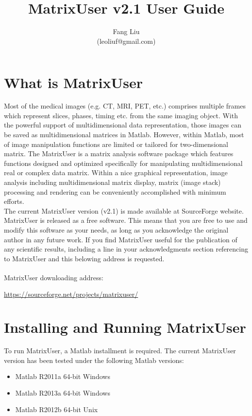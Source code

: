 \documentclass{article}%
\begin{document}
\title{MatrixUser v2.1 User Guide}
\author{Fang Liu \\ (leoliuf@gmail.com)}
\maketitle

\tableofcontents

\section{What is MatrixUser}
Most of the medical images (e.g. CT, MRI, PET, etc.) comprises multiple frames which represent slices, phases, timing etc. from the same imaging object. With the powerful support of multidimensional data representation, those images can be saved as multidimensional matrices in Matlab. However, within Matlab, most of image manipulation functions are limited or tailored for two-dimensional matrix. The MatrixUser is a matrix analysis software package which features functions designed and optimized specifically for manipulating multidimensional real or complex data matrix. Within a nice graphical representation, image analysis including multidimensional matrix display, matrix (image stack) processing and rendering can be conveniently accomplished with minimum efforts.\\

The current MatrixUser version (v2.1) is made available at SourceForge website. MatrixUser is released as a free software. This means that you are free to use and modify this software as your needs, as long as you acknowledge the original author in any future work. If you find MatrixUser useful for the publication of any scientific results, including a line in your acknowledgments section referencing to MatrixUser and this belowing address is requested.\\
\\
MatrixUser downloading address:
\begin{center}
\url{https://sourceforge.net/projects/matrixuser/}
\end{center}

\section{Installing and Running MatrixUser}

To run MatrixUser, a Matlab installment is required. The current MatrixUser version has been tested under the following Matlab versions:
\begin{itemize}
\item Matlab R2011a 64-bit Windows
\item Matlab R2013a 64-bit Windows
\item Matlab R2012b 64-bit Unix
\end{itemize}
\end{document}
